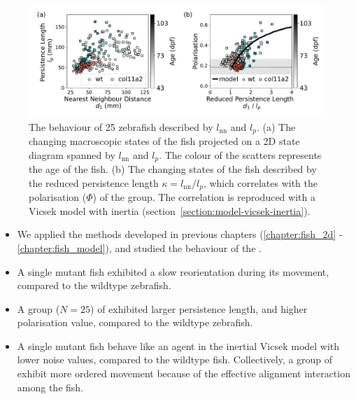 \documentclass[11pt,twoside]{report}
\begin{document}
 \begin{figure}
  \includegraphics[width=\linewidth]{phase-25}
  \caption[The behaviour of 25 zebrafish described by $l_\mathrm{nn}$ and $l_p$]{
	The behaviour of 25 zebrafish described by $l_\mathrm{nn}$ and $l_p$.
	(a) The changing macroscopic states of the fish projected on a 2D state diagram spanned by $l_\mathrm{nn}$ and $l_p$. The colour of the scatters represents the age of the fish.
	(b) The changing states of the fish described by the reduced persistence length $\kappa = l_\mathrm{nn} / l_p$, which correlates with the polarisation ($\Phi$) of the group. The correlation is reproduced with a Vicsek model with inertia (section~\ref{section:model-vicsek-inertia}).
  }
  \label{fig:phase-mutant}
\end{figure}

\vfill

\begin{adjustwidth}{0cm}{-5cm}
\begin{tcolorbox}[
title=Summary of Chapter~7,
fonttitle=\sffamily\Large,
right=0.1\linewidth,
enlarge bottom by=0.5em,
enlarge top by=0.5em,
]
\begin{itemize}
	\item We applied the methods developed in previous chapters (\ref{chapter:fish_2d} - \ref{chapter:fish_model}), and studied the behaviour of the {\mf}.
	\item A single mutant fish exhibited a slow reorientation during its movement, compared to the wildtype zebrafish.
	\item A group ($N=25$) of {\mf} exhibited larger persistence length, and higher polarisation value, compared to the wildtype zebrafish.
	\item A single mutant fish behave like an agent in the inertial Vicsek model with lower noise values, compared to the wildtype fish. Collectively, a group of {\mf} exhibit more ordered movement because of the effective alignment interaction among the fish. 
\end{itemize}
\end{tcolorbox}
\end{adjustwidth}
\end{document}
